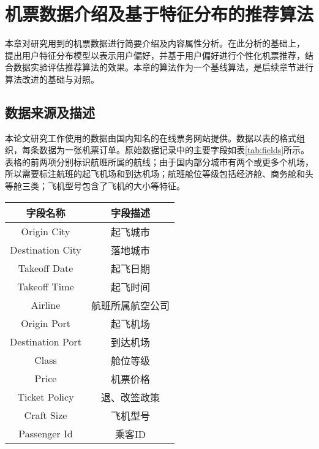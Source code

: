 
\chapter{机票数据介绍及基于特征分布的推荐算法}
\label{chap:baseline}
本章对研究用到的机票数据进行简要介绍及内容属性分析。在此分析的基础上，
提出用户特征分布模型以表示用户偏好，并基于用户偏好进行个性化机票推荐，结合数据实验评估推荐算法的效果。本章的算法作为一个基线算法，是后续章节进行算法改进的基础与对照。

\section{数据来源及描述}

本论文研究工作使用的数据由国内知名的在线票务网站提供。数据以表的格式组织，每条数据为一张机票订单。原始数据记录中的主要字段如表\ref{tab:fields}所示。
表格的前两项分别标识航班所属的航线；由于国内部分城市有两个或更多个机场，所以需要标注航班的起飞机场和到达机场；航班舱位等级包括经济舱、商务舱和头等舱三类；飞机型号包含了飞机的大小等特征。
\begin{table}[!h]
  \centering
  \begin{tabular}{|c|c|} \hline 
    字段名称 & 字段描述\\ \hline
    Origin City & 起飞城市 \\ \hline
    Destination City & 落地城市 \\ \hline
    Takeoff Date & 起飞日期 \\ \hline
    Takeoff Time & 起飞时间 \\ \hline
    Airline & 航班所属航空公司 \\ \hline
    Origin Port & 起飞机场 \\ \hline
    Destination Port & 到达机场 \\ \hline
    Class & 舱位等级 \\ \hline
    Price & 机票价格 \\ \hline
    Ticket Policy & 退、改签政策 \\ \hline
    Craft Size & 飞机型号 \\ \hline
    Passenger Id & 乘客ID \\ \hline
  \end{tabular}
\end{table}

